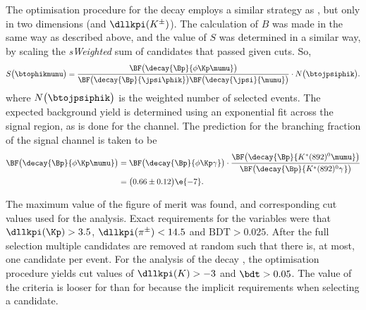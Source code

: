 The optimisation procedure for the decay \btophikmumu employs a similar strategy as \btokpipimumu,
but only in two dimensions  (\BDT and $\dllkpi(K^\pm)$).
The calculation of $B$ was made in the same way as described above, and the
value of $S$ was determined in a similar way, by scaling the \emph{sWeighted} sum of candidates
that passed given cuts.
So,
\begin{equation}
  S\big(\btophikmumu\big) = \\
  \frac{
    \BF\big(\decay{\Bp}{\phi\Kp\mumu}\big)
  }{
    \BF\big(\decay{\Bp}{\jpsi\phik}\big)
    \BF\big(\decay{\jpsi}{\mumu}\big)
  }
  \cdot
  N\big(\btojpsiphik\big).
\end{equation}
where $N\big(\btojpsiphik\big)$ is the weighted number of selected \btojpsiphik events.
The expected background yield is determined using an exponential fit across the signal region, as
is done for the \btokpipimumu channel.
The prediction for the branching fraction of the signal channel is taken to be
\begin{align}
  \BF\big(\decay{\Bp}{\phi\Kp\mumu}\big)
  &=
  \BF\big(\decay{\Bp}{\phi\Kp\gamma}\big)
  \cdot\frac{
    \BF\big(\decay{\Bp}{K^*(892)^0\mumu}\big)
  }{
    \BF\big(\decay{\Bp}{K^*(892)^0\gamma^{}}\big)
  }\nonumber\\
  &=\big(0.66\pm0.12\big)\e{-7}.
\end{align}


The maximum value of the figure of merit was found, and corresponding cut values used for the
analysis.
Exact requirements for the \pid variables were that $\dllkpi(\Kp)>3.5$, $\dllkpi(\pi^\pm)<14.5$ and
$\mathrm{BDT}>0.025$.
After the full selection multiple candidates are removed at random such that there is, at most, one
\btokpipimumu candidate per event.
For the analysis of the decay \btophikmumu, the optimisation procedure yields cut values of
$\dllkpi(K)>-3$ and $\bdt>0.05$.
The value of the \dllkpi criteria is looser for \btophikmumu than for \btokpipimumu because the
implicit \pid requirements when selecting a \phii candidate.








